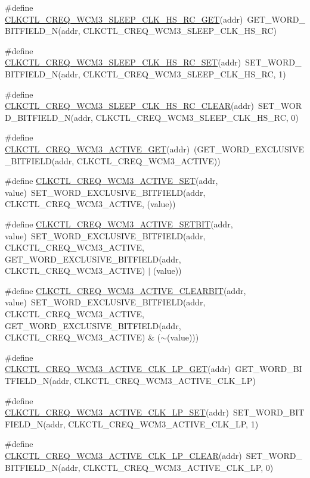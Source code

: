 \begin{DoxyCompactItemize}
\item 
\#define \hyperlink{a00544_a7dd9ce49819e16f6e51a3f928564d082}{CLKCTL\_\-CREQ\_\-WCM3\_\-SLEEP\_\-CLK\_\-HS\_\-RC\_\-GET}(addr)~GET\_\-WORD\_\-BITFIELD\_\-N(addr, CLKCTL\_\-CREQ\_\-WCM3\_\-SLEEP\_\-CLK\_\-HS\_\-RC)
\item 
\#define \hyperlink{a00544_a7b93c25efd38a684a4391d2630b22c28}{CLKCTL\_\-CREQ\_\-WCM3\_\-SLEEP\_\-CLK\_\-HS\_\-RC\_\-SET}(addr)~SET\_\-WORD\_\-BITFIELD\_\-N(addr, CLKCTL\_\-CREQ\_\-WCM3\_\-SLEEP\_\-CLK\_\-HS\_\-RC, 1)
\item 
\#define \hyperlink{a00544_a4b15c9d8a9166285f7bb79cf881535ac}{CLKCTL\_\-CREQ\_\-WCM3\_\-SLEEP\_\-CLK\_\-HS\_\-RC\_\-CLEAR}(addr)~SET\_\-WORD\_\-BITFIELD\_\-N(addr, CLKCTL\_\-CREQ\_\-WCM3\_\-SLEEP\_\-CLK\_\-HS\_\-RC, 0)
\item 
\#define \hyperlink{a00544_a7bef9458ebbe850ffa8962424c1c6e89}{CLKCTL\_\-CREQ\_\-WCM3\_\-ACTIVE\_\-GET}(addr)~(GET\_\-WORD\_\-EXCLUSIVE\_\-BITFIELD(addr, CLKCTL\_\-CREQ\_\-WCM3\_\-ACTIVE))
\item 
\#define \hyperlink{a00544_ac3f87747e317f9f9b17a95b2f977d8b7}{CLKCTL\_\-CREQ\_\-WCM3\_\-ACTIVE\_\-SET}(addr, value)~SET\_\-WORD\_\-EXCLUSIVE\_\-BITFIELD(addr, CLKCTL\_\-CREQ\_\-WCM3\_\-ACTIVE, (value))
\item 
\#define \hyperlink{a00544_a91d19ae2674aa440779beb2f23e6823e}{CLKCTL\_\-CREQ\_\-WCM3\_\-ACTIVE\_\-SETBIT}(addr, value)~SET\_\-WORD\_\-EXCLUSIVE\_\-BITFIELD(addr, CLKCTL\_\-CREQ\_\-WCM3\_\-ACTIVE, GET\_\-WORD\_\-EXCLUSIVE\_\-BITFIELD(addr, CLKCTL\_\-CREQ\_\-WCM3\_\-ACTIVE) $|$ (value))
\item 
\#define \hyperlink{a00544_a33c732cb18b7ab7e6dbe8cf410765f60}{CLKCTL\_\-CREQ\_\-WCM3\_\-ACTIVE\_\-CLEARBIT}(addr, value)~SET\_\-WORD\_\-EXCLUSIVE\_\-BITFIELD(addr, CLKCTL\_\-CREQ\_\-WCM3\_\-ACTIVE, GET\_\-WORD\_\-EXCLUSIVE\_\-BITFIELD(addr, CLKCTL\_\-CREQ\_\-WCM3\_\-ACTIVE) \& ($\sim$(value)))
\item 
\#define \hyperlink{a00544_a78cb8a4d1ef8d7c3ba97fa3fa69a23a3}{CLKCTL\_\-CREQ\_\-WCM3\_\-ACTIVE\_\-CLK\_\-LP\_\-GET}(addr)~GET\_\-WORD\_\-BITFIELD\_\-N(addr, CLKCTL\_\-CREQ\_\-WCM3\_\-ACTIVE\_\-CLK\_\-LP)
\item 
\#define \hyperlink{a00544_aa1c9dd8c212242879491b85e965ddd06}{CLKCTL\_\-CREQ\_\-WCM3\_\-ACTIVE\_\-CLK\_\-LP\_\-SET}(addr)~SET\_\-WORD\_\-BITFIELD\_\-N(addr, CLKCTL\_\-CREQ\_\-WCM3\_\-ACTIVE\_\-CLK\_\-LP, 1)
\item 
\#define \hyperlink{a00544_ab85bc9e866e6374935666619dea850f7}{CLKCTL\_\-CREQ\_\-WCM3\_\-ACTIVE\_\-CLK\_\-LP\_\-CLEAR}(addr)~SET\_\-WORD\_\-BITFIELD\_\-N(addr, CLKCTL\_\-CREQ\_\-WCM3\_\-ACTIVE\_\-CLK\_\-LP, 0)

\end{DoxyCompactItemize}
